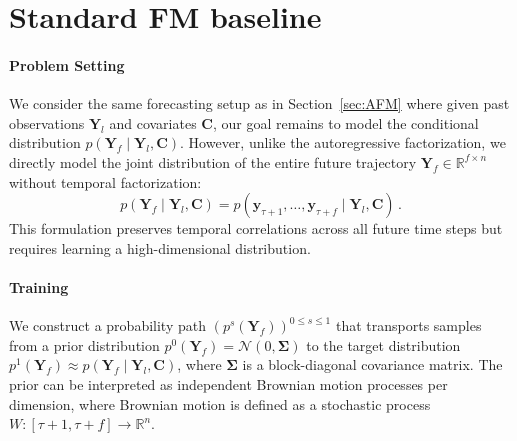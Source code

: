 \documentclass[a4paper,10pt,twocolumn,preprint,3p]{elsarticle}
\begin{document}
\clearpage
\appendix

\section{Standard FM baseline}\label{app:nafm}

\paragraph{Problem Setting} 
We consider the same forecasting setup as in Section~\ref{sec:AFM} where given past observations $\mathbf{Y}_l$ and covariates $\mathbf{C}$, our goal remains to model the conditional distribution $p(\mathbf{Y}_f \mid \mathbf{Y}_l, \mathbf{C})$. However, unlike the autoregressive factorization, we directly model the joint distribution of the entire future trajectory $\mathbf{Y}_f \in \mathbb{R}^{f \times n}$ without temporal factorization:
\begin{equation}
    p(\mathbf{Y}_f \mid \mathbf{Y}_l, \mathbf{C}) = p(\mathbf{y}_{\tau+1}, \ldots, \mathbf{y}_{\tau+f} \mid \mathbf{Y}_l, \mathbf{C}) \,.
\end{equation}
This formulation preserves temporal correlations across all future time steps but requires learning a high-dimensional distribution.

\paragraph{Training}
We construct a probability path $(p^s(\mathbf{Y}_f))^{0\leq s \leq 1}$ that transports samples from a prior distribution $p^0(\mathbf{Y}_f) = \mathcal{N}(0, \mathbf{\Sigma})$ to the target distribution $p^1(\mathbf{Y}_f) \approx p(\mathbf{Y}_f\mid\mathbf{Y}_l,\mathbf{C})$, where $\mathbf{\Sigma}$ is a block-diagonal covariance matrix. The prior can be interpreted as independent Brownian motion processes per dimension, where Brownian motion is defined as a stochastic process $W \colon [\tau+1,\tau+f] \to \mathbb{R}^n$.
\end{document}
